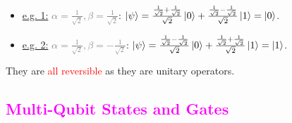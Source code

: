 \documentclass{book}
\begin{document}
\begin{enumerate}
\begin{center}
    \end{center}
    \begin{itemize}
        \item \uline{e.g. 1:} \textcolor{gray}{\(\alpha = \frac{1}{\sqrt{2}}, \beta = \frac{1}{\sqrt{2}}\)}: \textcolor{forestgreen}{\(\ket{\psi} = \frac{\frac{1}{\sqrt{2}} + \frac{1}{\sqrt{2}}}{\sqrt{2}} \ket{0} + \frac{\frac{1}{\sqrt{2}} - \frac{1}{\sqrt{2}}}{\sqrt{2}} \ket{1} = \ket{0}\)}.
        \item \uline{e.g. 2:} \textcolor{gray}{\(\alpha = \frac{1}{\sqrt{2}}, \beta = -\frac{1}{\sqrt{2}}\)}: \textcolor{forestgreen}{\(\ket{\psi} = \frac{\frac{1}{\sqrt{2}} - \frac{1}{\sqrt{2}}}{\sqrt{2}} \ket{0} + \frac{\frac{1}{\sqrt{2}} + \frac{1}{\sqrt{2}}}{\sqrt{2}} \ket{1} = \ket{1}\)}.
    \end{itemize}
\end{enumerate}
They are \textcolor{red}{all reversible} as they are unitary operators.\\
\textcolor{magenta}{\section{\textbf{Multi-Qubit States and Gates}}}
\end{document}
